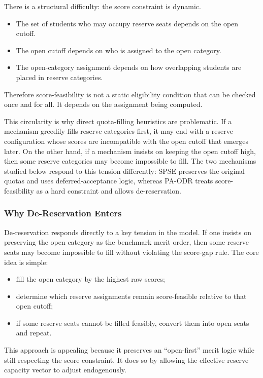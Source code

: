 \documentclass[12pt]{article}
\newcommand{\1}{\mathbf{1}}
\begin{document}
There is a structural difficulty: the score constraint is dynamic.

\begin{itemize}
\item The set of students who may occupy reserve seats depends on the open cutoff.
\item The open cutoff depends on who is assigned to the open category.
\item The open-category assignment depends on how overlapping students are placed in reserve categories.
\end{itemize}

Therefore score-feasibility is not a static eligibility condition that can be checked once and for all. It depends on the assignment being computed.

This circularity is why direct quota-filling heuristics are problematic. If a mechanism greedily fills reserve categories first, it may end with a reserve configuration whose scores are incompatible with the open cutoff that emerges later. On the other hand, if a mechanism insists on keeping the open cutoff high, then some reserve categories may become impossible to fill. The two mechanisms studied below respond to this tension differently: SPSE preserves the original quotas and uses deferred-acceptance logic, whereas PA-ODR treats score-feasibility as a hard constraint and allows de-reservation.

\subsubsection{Why De-Reservation Enters}

De-reservation responds directly to a key tension in the model. If one insists on preserving the open category as the benchmark merit order, then some reserve seats may become impossible to fill without violating the score-gap rule. The core idea is simple:

\begin{itemize}
\item fill the open category by the highest raw scores;
\item determine which reserve assignments remain score-feasible relative to that open cutoff;
\item if some reserve seats cannot be filled feasibly, convert them into open seats and repeat.
\end{itemize}

This approach is appealing because it preserves an ``open-first'' merit logic while still respecting the score constraint. It does so by allowing the effective reserve capacity vector to adjust endogenously.
\end{document}
